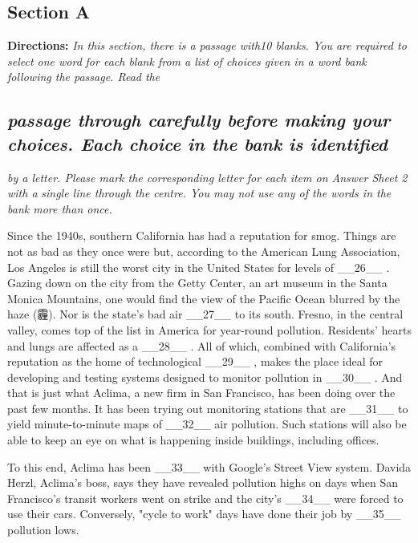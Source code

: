 \documentclass[UTF8,11pt]{ctexart}
\begin{document}
\subsection*{\textbf{Section A}}


\textbf{Directions:}\textit{ In this section, there is a passage with10 blanks. You are required to select one word} \textit{for each blank from a list of choices given in a word bank following the passage. Read the}


\subsection*{\textit{passage through carefully before making your choices. Each choice in the bank is identified}}


\textit{by a letter. Please mark the corresponding letter for each item on Answer Sheet 2 with a} \textit{single line through the centre. You may not use any of the words in the bank more than once.}


Since the 1940s, southern California has had a reputation for smog. Things are not as bad as they once were but, according to the American Lung Association, Los Angeles is still the worst city in the United States for levels of \_\_26\_\_ . Gazing down on the city from the Getty Center, an art museum in the Santa Monica Mountains, one would find the view of the Pacific Ocean blurred by the haze (霾). Nor is the state's bad air \_\_27\_\_ to its south. Fresno, in the central valley, comes top of the list in America for year-round pollution. Residents' hearts and lungs are affected as a \_\_28\_\_ . All of which, combined with California's reputation as the home of technological \_\_29\_\_ , makes the place ideal for developing and testing systems designed to monitor pollution in \_\_30\_\_ . And that is just what Aclima, a new firm in San Francisco, has been doing over the past few months. It has been trying out monitoring stations that are \_\_31\_\_ to yield minute-to-minute maps of \_\_32\_\_ air pollution. Such stations will also be able to keep an eye on what is happening inside buildings, including offices.


To this end, Aclima has been \_\_33\_\_ with Google's Street View system. Davida Herzl, Aclima's boss, says they have revealed pollution highs on days when San Francisco's transit workers went on strike and the city's \_\_34\_\_ were forced to use their cars. Conversely, "cycle to work" days have done their job by \_\_35\_\_ pollution lows.
\end{document}
